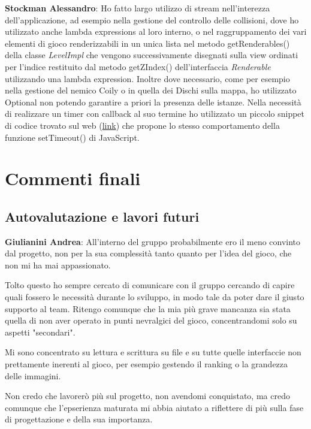 \documentclass[a4paper,12pt, hidelinks]{report}
\begin{document}
	\item \textbf{Stockman Alessandro}: Ho fatto largo utilizzo di stream nell'interezza dell'applicazione, ad esempio nella gestione del controllo delle collisioni, dove ho utilizzato anche lambda expressions al loro interno, o nel raggruppamento dei vari elementi di gioco renderizzabili in un unica lista nel metodo getRenderables() della classe \emph{LevelImpl} che vengono successivamente disegnati sulla view ordinati per l'indice restituito dal metodo getZIndex() dell'interfaccia \emph{Renderable} utilizzando una lambda expression.
	Inoltre dove necessario, come per esempio nella gestione del nemico Coily o in quella dei Dischi sulla mappa, ho utilizzato Optional non potendo garantire a priori la presenza delle istanze.
	Nella necessità di realizzare un timer con callback al suo termine ho utilizzato un piccolo snippet di codice trovato sul web (\href{https://stackoverflow.com/questions/26311470/what-is-the-equivalent-of-javascript-settimeout-in-java}{link}) che propone lo stesso comportamento della funzione setTimeout() di JavaScript.

\chapter{Commenti finali}


\section{Autovalutazione e lavori futuri}

	\item \textbf{Giulianini Andrea}: All'interno del gruppo probabilmente ero il meno convinto dal progetto, non per la sua complessità tanto quanto per l'idea del gioco, che non mi ha mai appassionato.
	
Tolto questo ho sempre cercato di comunicare con il gruppo cercando di capire quali fossero le necessità durante lo sviluppo, in modo tale da poter dare il giusto supporto al team. Ritengo comunque che la mia più grave mancanza sia stata quella di non aver operato in punti nevralgici del gioco, concentrandomi solo su aspetti "secondari".

Mi sono concentrato su lettura e scrittura su file e su tutte quelle interfaccie non prettamente inerenti al gioco, per esempio gestendo il ranking o la grandezza delle immagini.

Non credo che lavorerò più sul progetto, non avendomi conquistato, ma credo comunque che l'epserienza maturata mi abbia aiutato a riflettere di più sulla fase di progettazione e della sua importanza.
\end{document}
